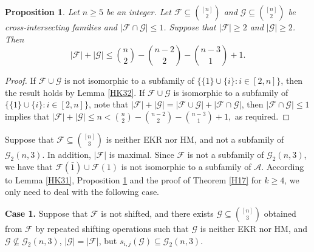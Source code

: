 \documentclass[11pt]{article}
\numberwithin{equation}{section}
\newtheorem{prop}[theorem]{Proposition}
\begin{document}
\begin{prop}\label{pr3}
Let $n \geq 5$ be an integer. Let $\mathcal{F} \subseteq\binom{[n]}{2}$ and $\mathcal{G} \subseteq\binom{[n]}{2}$ be  cross-intersecting families and $|\mathcal{F} \cap \mathcal{G}|\leq 1$. Suppose that $|\mathcal{F}| \geq 2$ and $|\mathcal{G}| \geq 2$. Then
$$
|\mathcal{F}|+|\mathcal{G}| \leq\binom{n}{2}-\binom{n-2}{2}-\binom{n-3}{1}+1.
$$
\end{prop}
\begin{proof}
If $\mathcal{F}\cup \mathcal{G}$ is not isomorphic to a subfamily of $\{\{1\} \cup\{i\}: i \in[2, n]\}$, then the result holds by Lemma \ref{HK32}.
If $\mathcal{F}\cup \mathcal{G}$ is isomorphic to a subfamily of $\{\{1\} \cup\{i\}: i \in[2, n]\}$, note that $|\mathcal{F}|+|\mathcal{G}|=|\mathcal{F}\cup \mathcal{G}|+|\mathcal{F}\cap \mathcal{G}|$, then $|\mathcal{F} \cap \mathcal{G}|\leq 1$ implies that
$
|\mathcal{F}|+|\mathcal{G}| \leq n<\binom{n}{2}-\binom{n-2}{2}-\binom{n-3}{1}+1,$
as required.
\end{proof}



Suppose that $\mathcal{F}\subseteq\binom{[n]}{3}$ is neither EKR nor HM, and not a subfamily of $\mathcal{G}_2(n, 3)$. In addition, $|\mathcal{F}|$ is maximal.
Since $\mathcal{F}$ is not a subfamily of $\mathcal{G}_2(n, 3)$, we have that $\mathcal{F}(\bar{1})\cup\mathcal{F}(1)$ is not isomorphic to a subfamily of $\mathcal{A}$.  According to Lemma \ref{HK31}, Proposition \ref{pr3} and the proof of Theorem \ref{H17} for $k\geq 4$, we only need to deal with the following case.

{\bf Case 1.}
Suppose that $\mathcal{F}$ is not shifted, and there exists $\mathcal{G} \subseteq\binom{[n]}{3}$ obtained from $\mathcal{F}$ by repeated shifting operations such that $\mathcal{G}$  is neither EKR nor HM, and $\mathcal{G}\nsubseteq \mathcal{G}_2(n, 3)$, $|\mathcal{G}|=|\mathcal{F}|$, but
$s_{i, j}(\mathcal{G})\subseteq \mathcal{G}_2(n, 3)$.
\end{document}
